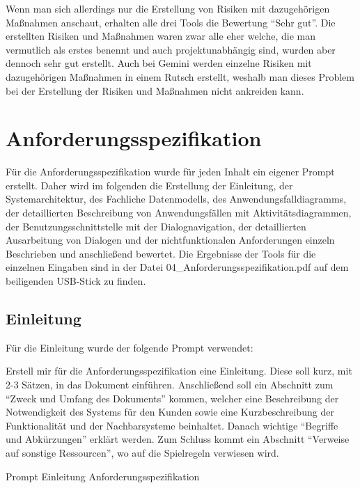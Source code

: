 Wenn man sich allerdings nur die Erstellung von Risiken mit dazugehörigen Maßnahmen anschaut, erhalten alle drei 
Tools die Bewertung ``Sehr gut''. Die erstellten Risiken und Maßnahmen waren zwar alle eher welche, die man vermutlich 
als erstes benennt und auch projektunabhängig sind, wurden aber dennoch sehr gut erstellt. Auch bei Gemini werden 
einzelne Risiken mit dazugehörigen Maßnahmen in einem Rutsch erstellt, weshalb man dieses Problem bei der Erstellung 
der Risiken und Maßnahmen nicht ankreiden kann.

\section{Anforderungsspezifikation}  \label{CompAnforderungsspezifikation}

Für die Anforderungsspezifikation wurde für jeden Inhalt ein eigener Prompt erstellt. Daher wird im folgenden die Erstellung der Einleitung, 
der Systemarchitektur, des Fachliche Datenmodells, des Anwendungsfalldiagramms, der detaillierten Beschreibung von Anwendungsfällen mit Aktivitätsdiagrammen, 
der Benutzungsschnittstelle mit der Dialognavigation, der detaillierten Ausarbeitung von Dialogen und der nichtfunktionalen Anforderungen einzeln
Beschrieben und anschließend bewertet. Die Ergebnisse der Tools für die einzelnen Eingaben sind in der Datei 04\_Anforderungsspezifikation.pdf auf 
dem beiligenden USB-Stick zu finden.

\clearpage

\subsection*{Einleitung}

Für die Einleitung wurde der folgende Prompt verwendet:

\begin{prompt}[H]
    \begin{tcolorbox}[colback=gray!20, colframe=gray!20, boxrule=0pt, sharp corners] 
        Erstell mir für die Anforderungsspezifikation eine Einleitung. Diese soll kurz, mit 2-3 Sätzen, in das Dokument einführen. Anschließend soll 
        ein Abschnitt zum ``Zweck und Umfang des Dokuments'' kommen, welcher eine Beschreibung der Notwendigkeit des Systems für den Kunden sowie eine 
        Kurzbeschreibung der Funktionalität und der Nachbarsysteme beinhaltet. Danach wichtige ``Begriffe und Abkürzungen'' erklärt werden. Zum Schluss 
        kommt ein Abschnitt ``Verweise auf sonstige Ressourcen'', wo auf die Spielregeln verwiesen wird.
        \vfill
    \end{tcolorbox}
    \caption{Prompt Einleitung Anforderungsspezifikation}
    \label{Prompt Einleitung Anforderungsspezifikation}
\end{prompt}

